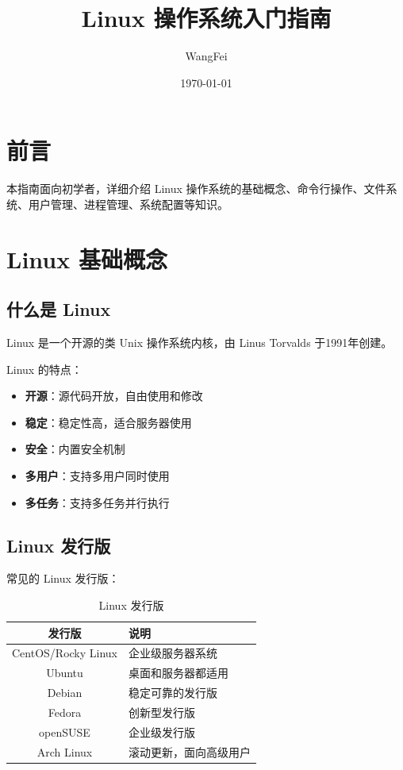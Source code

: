 \documentclass[12pt,UTF8]{ctexbook}
\title{\heiti\zihao{0} Linux 操作系统入门指南}
\author{WangFei}
\date{\today}
\begin{document}
\maketitle
\tableofcontents

\frontmatter
\chapter{前言}

本指南面向初学者，详细介绍 Linux 操作系统的基础概念、命令行操作、文件系统、用户管理、进程管理、系统配置等知识。

\mainmatter

\chapter{Linux 基础概念}
\label{chap:linux_basics}

\section{什么是 Linux}
\label{sec:what_is_linux}

Linux 是一个开源的类 Unix 操作系统内核，由 Linus Torvalds 于1991年创建。

Linux 的特点：
\begin{itemize}
    \item \textbf{开源}：源代码开放，自由使用和修改
    \item \textbf{稳定}：稳定性高，适合服务器使用
    \item \textbf{安全}：内置安全机制
    \item \textbf{多用户}：支持多用户同时使用
    \item \textbf{多任务}：支持多任务并行执行
\end{itemize}

\section{Linux 发行版}
\label{sec:linux_distributions}

常见的 Linux 发行版：
\begin{table}[htbp]
    \centering
    \caption{Linux 发行版}
    \begin{tabular}{|c|p{8cm}|}
        \hline
        \textbf{发行版} & \textbf{说明} \\
        \hline
        CentOS/Rocky Linux & 企业级服务器系统 \\
        \hline
        Ubuntu & 桌面和服务器都适用 \\
        \hline
        Debian & 稳定可靠的发行版 \\
        \hline
        Fedora & 创新型发行版 \\
        \hline
        openSUSE & 企业级发行版 \\
        \hline
        Arch Linux & 滚动更新，面向高级用户 \\
        \hline
    \end{tabular}
\end{table}
\end{document}
